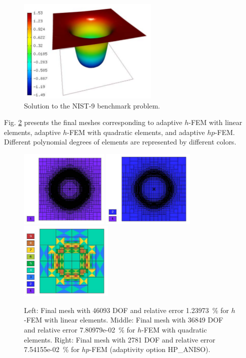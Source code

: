 \documentclass[12pt]{elsarticle}
\begin{document}
\begin{figure}[H]
\centering
\vspace{-3mm}
\includegraphics[height=5cm]{mafig53.pdf}
\vspace{-1mm}
\caption{Solution to the NIST-9 benchmark problem.}
\vspace{-1mm}
\label{fig:sln-nist09}
\end{figure}

Fig. \ref{fig:nist-9-hp-aniso} presents the final meshes corresponding to adaptive $h$-FEM with
linear elements, adaptive $h$-FEM with quadratic elements, and adaptive $hp$-FEM. Different
polynomial degrees of elements are represented by different colors.

\begin{figure}[H]
\centering
\includegraphics[height=3.7cm]{mafig54.pdf}
\includegraphics[height=3.7cm]{mafig55.pdf}
\includegraphics[height=3.7cm]{mafig56.pdf}
\caption{
Left: Final mesh with 46093 DOF and relative error 1.23973~\% for $h$-FEM with linear elements.
Middle: Final mesh with 36849 DOF and relative error 7.80979e-02~\% for $h$-FEM with quadratic elements.
Right: Final mesh with 2781 DOF and relative error 7.54155e-02~\% for $hp$-FEM (adaptivity option HP\_ANISO).}
\vspace{-5mm}
\label{fig:nist-9-hp-aniso}
\end{figure}
\end{document}
